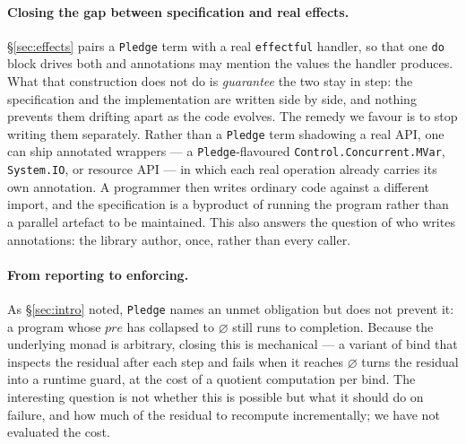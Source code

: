 \documentclass[acmsmall,screen]{acmart}
\newcommand{\pre}{\mathit{pre}}
\begin{document}
\paragraph{Closing the gap between specification and real effects.}
\S\ref{sec:effects} pairs a \lstinline{Pledge} term with a real
\texttt{effectful} handler, so that one \lstinline{do} block drives both and
annotations may mention the values the handler produces.
What that construction does not do is \emph{guarantee} the two stay in
step: the specification and the implementation are written side by side, and
nothing prevents them drifting apart as the code evolves.
The remedy we favour is to stop writing them separately.
Rather than a \lstinline{Pledge} term shadowing a real API, one can ship
annotated wrappers --- a \lstinline{Pledge}-flavoured
\lstinline{Control.Concurrent.MVar}, \lstinline{System.IO}, or resource
API --- in which each real operation already carries its own annotation.
A programmer then writes ordinary code against a different import, and the
specification is a byproduct of running the program rather than a parallel
artefact to be maintained.
This also answers the question of who writes annotations: the library
author, once, rather than every caller.

\paragraph{From reporting to enforcing.}
As \S\ref{sec:intro} noted, \lstinline{Pledge} names an unmet obligation but
does not prevent it: a program whose $\pre$ has collapsed to $\varnothing$
still runs to completion.
Because the underlying monad is arbitrary, closing this is mechanical ---
a variant of bind that inspects the residual after each step and fails when
it reaches $\varnothing$ turns the residual into a runtime guard, at the
cost of a quotient computation per bind.
The interesting question is not whether this is possible but what it should
do on failure, and how much of the residual to recompute incrementally;
we have not evaluated the cost.
\end{document}
